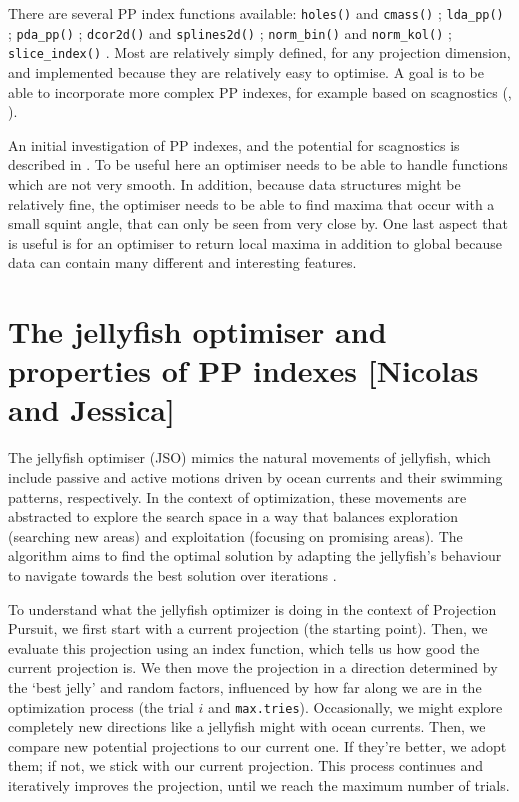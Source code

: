 \documentclass[
  number,
  preprint,
  3p]{elsarticle}
\begin{document}
There are several PP index functions available: \texttt{holes()} and
\texttt{cmass()} \citep{cook1993projection}; \texttt{lda\_pp()}
\citep{lee2005projection}; \texttt{pda\_pp()} \citep{lee2010projection};
\texttt{dcor2d()} and \texttt{splines2d()} \citep{Grimm2016};
\texttt{norm\_bin()} and \texttt{norm\_kol()} \citep{huber85};
\texttt{slice\_index()} \citep{Laa:2020wkm}. Most are relatively simply
defined, for any projection dimension, and implemented because they are
relatively easy to optimise. A goal is to be able to incorporate more
complex PP indexes, for example based on scagnostics (\citet{scag},
\citet{WW08}).

An initial investigation of PP indexes, and the potential for
scagnostics is described in \citet{laa_using_2020}. To be useful here an
optimiser needs to be able to handle functions which are not very
smooth. In addition, because data structures might be relatively fine,
the optimiser needs to be able to find maxima that occur with a small
squint angle, that can only be seen from very close by. One last aspect
that is useful is for an optimiser to return local maxima in addition to
global because data can contain many different and interesting features.

\section{The jellyfish optimiser and properties of PP indexes {[}Nicolas
and Jessica{]}}\label{sec-theory}

The jellyfish optimiser (JSO) mimics the natural movements of jellyfish,
which include passive and active motions driven by ocean currents and
their swimming patterns, respectively. In the context of optimization,
these movements are abstracted to explore the search space in a way that
balances exploration (searching new areas) and exploitation (focusing on
promising areas). The algorithm aims to find the optimal solution by
adapting the jellyfish's behaviour to navigate towards the best solution
over iterations \citep{chou_novel_2021}.

To understand what the jellyfish optimizer is doing in the context of
Projection Pursuit, we first start with a current projection (the
starting point). Then, we evaluate this projection using an index
function, which tells us how good the current projection is. We then
move the projection in a direction determined by the `best jelly' and
random factors, influenced by how far along we are in the optimization
process (the trial \(i\) and \texttt{max.tries}). Occasionally, we might
explore completely new directions like a jellyfish might with ocean
currents. Then, we compare new potential projections to our current one.
If they're better, we adopt them; if not, we stick with our current
projection. This process continues and iteratively improves the
projection, until we reach the maximum number of trials.
\end{document}
